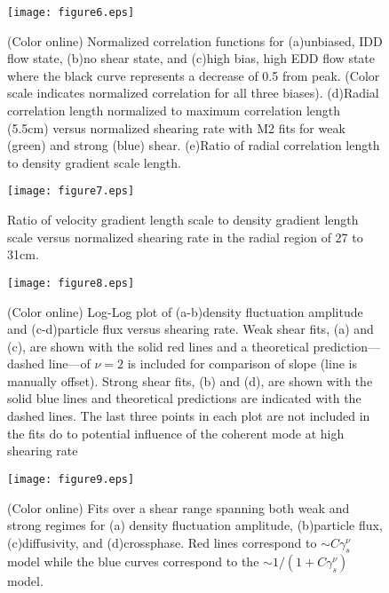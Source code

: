 \documentclass[aip,pop,amsmath,amssymb,preprint,superscriptaddress]{revtex4-1} %
\begin{document}
\begin{figure}[!htbp]
\centerline{
\texttt{[image: figure6.eps]}}
\caption{\label{fig:radcorr} (Color online) Normalized correlation functions for (a)unbiased, IDD flow state, (b)no shear state, and (c)high bias, high EDD flow state where the black curve represents a decrease of 0.5 from peak. (Color scale indicates normalized correlation for all three biases). (d)Radial correlation length normalized to maximum correlation length (5.5cm) versus normalized shearing rate with M2 fits for weak (green) and strong (blue) shear. (e)Ratio of radial correlation length to density gradient scale length.}
\end{figure}

\begin{figure}[!htbp]
\centerline{
\texttt{[image: figure7.eps]}}
\caption{\label{fig:LgammaLn} Ratio of velocity gradient length scale
  to density gradient length scale versus normalized shearing rate in the radial region of 27 to 31cm.}
\end{figure}

\begin{figure}[!htbp]
\centerline{
\texttt{[image: figure8.eps]}}
\caption{\label{fig:densloglog_strong} (Color online) Log-Log plot of (a-b)density
  fluctuation amplitude and (c-d)particle flux versus shearing rate. Weak shear fits, (a) and (c), are shown with the solid red lines and a theoretical prediction---dashed line---of $\nu = 2$ is included for comparison of slope (line is manually offset). Strong shear fits, (b) and (d), are shown with the solid blue lines and theoretical predictions are indicated with the dashed lines. The last three points in each plot are not included in the fits do to potential influence of the coherent mode at high shearing rate}
\end{figure}

\begin{figure}[!htbp]
\centerline{
\texttt{[image: figure9.eps]}}
\caption{\label{fig:fullrange_fits} (Color online) Fits over a shear range spanning both weak and strong regimes for (a) density fluctuation amplitude, (b)particle flux, (c)diffusivity, and (d)crossphase. Red lines correspond to $\sim C\gamma_{s}^{\nu}$ model while the blue curves correspond to the $\sim 1/(1+C\gamma_{s}^{\nu})$ model.}
\end{figure}
\end{document}
